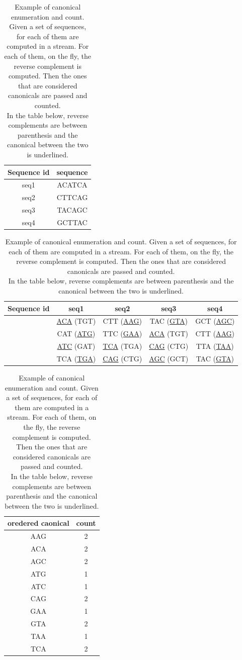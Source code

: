 \begin{table}
	\centering
	\caption{Example of canonical \kmers enumeration and count. Given a set of sequences, for each of them \kmers are computed in a stream. For each of them, on the fly, the reverse complement is computed. Then the ones that are considered canonicals are passed and counted.\\ In the table below, reverse complements are between parenthesis and the canonical between the two is underlined.}
	\begin{center}
	\begin{tabular}{c | c}

		Sequence id & sequence \\
		\hline
		seq1 & ACATCA \\
		seq2 & CTTCAG \\
		seq3 & TACAGC \\
		seq4 & GCTTAC \\
		
	\end{tabular}
\newline
\vspace*{0.2 cm}
\newline

	\begin{tabular}{c | c c c c}

		Sequence id & seq1 & seq2 & seq3 & seq4\\
		\hline
		\kmers  & \underline{ACA} (TGT) & CTT (\underline{AAG}) & TAC (\underline{GTA}) & GCT (\underline{AGC}) \\
			    & CAT (\underline{ATG}) & TTC (\underline{GAA}) & \underline{ACA} (TGT) & CTT (\underline{AAG}) \\
				& \underline{ATC} (GAT) & \underline{TCA} (TGA) & \underline{CAG} (CTG) & TTA (\underline{TAA}) \\
				& TCA (\underline{TGA}) & \underline{CAG} (CTG) & \underline{AGC} (GCT) & TAC (\underline{GTA}) \\
	\end{tabular}
\newline
\vspace*{0.2 cm}
\newline

	\begin{tabular}{c c}

		oredered caonical \kmer & count\\
		\hline
		AAG & 2 \\
		ACA & 2 \\
		AGC & 2 \\
		ATG & 1 \\
		ATC & 1 \\
		CAG & 2 \\
		GAA & 1 \\
		GTA & 2 \\
		TAA & 1 \\
		TCA & 2 \\
		
	\end{tabular}
\end{center}
	\label{tab-lista-kmer}
\end{table}


